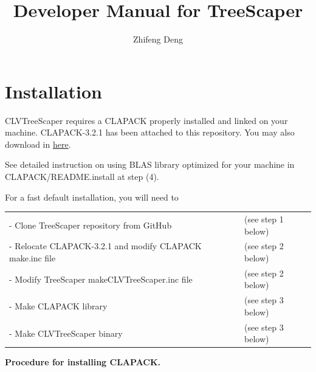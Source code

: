 \documentclass[11pt,a4paper]{article}
\title{Developer Manual for TreeScaper}
\author{Zhifeng Deng}
\theoremstyle{definition}
\theoremstyle{definition}
\numberwithin{equation}{section}
\begin{document}
	\maketitle

	
	
	\section{Installation}
	

	CLVTreeScaper requires a CLAPACK properly installed and linked on your machine. 
	CLAPACK-3.2.1 has been attached to this repository. You may also download in \href{https://www.netlib.org/clapack/}{here}.
	
	
	
	See detailed instruction on using BLAS library optimized for your machine in 
	CLAPACK/README.install at step (4).
	
	
	
	For a fast default installation, you will need to
	\begin{table}[!h]
		\begin{tabular}{ll}
			- Clone TreeScaper repository from GitHub                   &(see step 1 below)\\
			- Relocate CLAPACK-3.2.1 and modify CLAPACK make.inc file   &(see step 2 below)\\
			- Modify TreeScaper makeCLVTreeScaper.inc file              &(see step 2 below)\\
			- Make CLAPACK library                                      &(see step 3 below)\\
			- Make CLVTreeScaper binary                                 &(see step 3 below)\\
		\end{tabular}
	\end{table}
	
	
	
	\textbf{Procedure for installing CLAPACK.}
	
	
	
\end{document}
